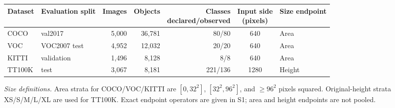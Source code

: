 \begin{tabular*}{\textwidth}{@{\extracolsep{\fill}}llrrrcl@{}}
\toprule
Dataset & Evaluation split & Images & Objects & \shortstack{Classes\\declared/observed} & \shortstack{Input side\\(pixels)} & Size endpoint \\
\midrule
COCO & val2017 & 5,000 & 36,781 & 80/80 & 640 & Area \\
VOC & VOC2007 test & 4,952 & 12,032 & 20/20 & 640 & Area \\
KITTI & validation & 1,496 & 8,128 & 8/8 & 640 & Area \\
TT100K & test & 3,067 & 8,181 & 221/136 & 1280 & Height \\
\bottomrule
\end{tabular*}
\par\vspace{4pt}\begin{minipage}{\textwidth}\footnotesize
\textit{Size definitions.} Area strata for COCO/VOC/KITTI are $[0,32^2]$, $[32^2,96^2]$, and $\geq96^2$ pixels squared. Original-height strata XS/S/M/L/XL are used for TT100K. Exact endpoint operators are given in S1; area and height endpoints are not pooled.
\end{minipage}
